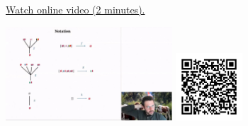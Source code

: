 
\begin{minipage}{10cm}
    \href{https://act4e-spring21.netlify.app/videos/spring2021-operads-a:notation-operad.html}{Watch online video (2 minutes).}
        
    \href{https://act4e-spring21.netlify.app/videos/spring2021-operads-a:notation-operad.html}{\includegraphics[height=3.5cm]{spring2021-operads-a:notation-operad/thumbnails.jpg}}
    \href{https://act4e-spring21.netlify.app/videos/spring2021-operads-a:notation-operad.html}{\includegraphics[height=2.5cm]{spring2021-operads-a:notation-operad/qrcode.png}}
\end{minipage}
